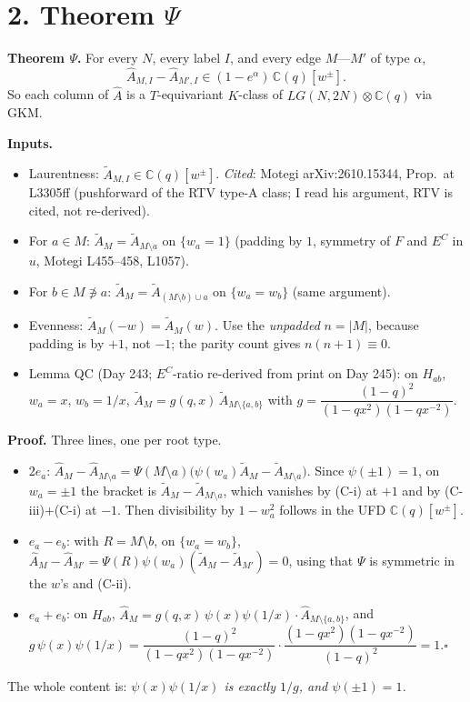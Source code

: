 \documentclass[10pt]{article}
\newcommand{\At}{\tilde A}
\newcommand{\Ah}{\widehat A}
\begin{document}
\section*{2. Theorem $\Psi$ }
\textbf{Theorem $\Psi$.} For every $N$, every label $I$, and every edge $M$---$M'$ of type $\alpha$,
\[\Ah_{M,I}-\Ah_{M',I}\in(1-e^\alpha)\,\mathbb C(q)[w^{\pm}].\]
So each column of $\Ah$ is a $T$-equivariant $K$-class of $LG(N,2N)\otimes\mathbb C(q)$ via GKM.

\textbf{Inputs.}
\begin{itemize}
\item[(L)] Laurentness: $\At_{M,I}\in\mathbb C(q)[w^\pm]$. \emph{Cited}: Motegi arXiv:2610.15344, Prop.\ at L3305ff (pushforward of the RTV type-A class; I read his argument, RTV is cited, not re-derived).
\item[(C-i)] For $a\in M$: $\At_M=\At_{M\setminus a}$ on $\{w_a=1\}$ (padding by $1$, symmetry of $F$ and $E^C$ in $u$, Motegi L455--458, L1057).
\item[(C-ii)] For $b\in M\not\ni a$: $\At_M=\At_{(M\setminus b)\cup a}$ on $\{w_a=w_b\}$ (same argument).
\item[(C-iii)] Evenness: $\At_M(-w)=\At_M(w)$. Use the \emph{unpadded} $n=|M|$, because padding is by $+1$, not $-1$; the parity count gives $n(n+1)\equiv0$.
\item[(QC)] Lemma QC (Day 243; $E^C$-ratio re-derived from print on Day 245): on $H_{ab}$, $w_a=x$, $w_b=1/x$,
$\At_M=g(q,x)\,\At_{M\setminus\{a,b\}}$ with $g=\dfrac{(1-q)^2}{(1-qx^2)(1-qx^{-2})}$.
\end{itemize}

\textbf{Proof.} Three lines, one per root type.
\begin{itemize}
\item $2e_a$: $\Ah_M-\Ah_{M\setminus a}=\Psi(M\setminus a)\bigl(\psi(w_a)\At_M-\At_{M\setminus a}\bigr)$. Since $\psi(\pm1)=1$, on $w_a=\pm1$ the bracket
is $\At_M-\At_{M\setminus a}$, which vanishes by (C-i) at $+1$ and by (C-iii)+(C-i) at $-1$. Then divisibility by $1-w_a^2$ follows in the UFD $\mathbb C(q)[w^\pm]$.
\item $e_a-e_b$: with $R=M\setminus b$, on $\{w_a=w_b\}$, $\Ah_M-\Ah_{M'}=\Psi(R)\psi(w_a)(\At_M-\At_{M'})=0$, using that $\Psi$ is symmetric in the $w$'s and (C-ii).
\item $e_a+e_b$: on $H_{ab}$, $\Ah_M=g(q,x)\,\psi(x)\psi(1/x)\cdot\Ah_{M\setminus\{a,b\}}$, and
$g\,\psi(x)\psi(1/x)=\dfrac{(1-q)^2}{(1-qx^2)(1-qx^{-2})}\cdot\dfrac{(1-qx^2)(1-qx^{-2})}{(1-q)^2}=1.$\hfill$\square$
\end{itemize}
The whole content is: \emph{$\psi(x)\psi(1/x)$ is exactly $1/g$, and $\psi(\pm1)=1$.}
\end{document}
